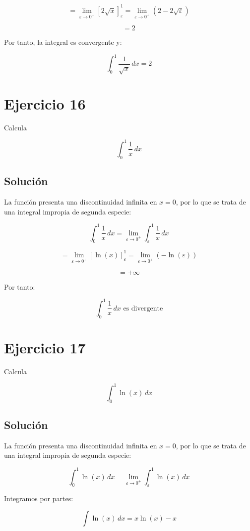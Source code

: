 \documentclass[fleqn]{article}
\begin{document}
	\[
	=
	\lim_{\varepsilon\to0^+}
	\left[
	2\sqrt{x}
	\right]_{\varepsilon}^1
	=
	\lim_{\varepsilon\to0^+}
	\left(
	2-2\sqrt{\varepsilon}
	\right)
	\]

	\[
	=
	2
	\]

	Por tanto, la integral es convergente y:

	\[
	\boxed{
	\int_0^1\frac{1}{\sqrt{x}}\,dx=2
	}
	\]

\section{Ejercicio 16}
	Calcula

	\[
	\int_0^1\frac{1}{x}\,dx
	\]

	\subsection{Solución}

	La función presenta una discontinuidad infinita en $x=0$, por lo que se trata de una integral impropia de segunda especie:

	\[
	\int_0^1\frac{1}{x}\,dx
	=
	\lim_{\varepsilon\to0^+}
	\int_{\varepsilon}^1\frac{1}{x}\,dx
	\]

	\[
	=
	\lim_{\varepsilon\to0^+}
	\left[
	\ln(x)
	\right]_{\varepsilon}^1
	=
	\lim_{\varepsilon\to0^+}
	\left(
	-\ln(\varepsilon)
	\right)
	\]

	\[
	=
	+\infty
	\]

	Por tanto:

	\[
	\boxed{
	\int_0^1\frac{1}{x}\,dx
	\text{ es divergente}
	}
	\]

\section{Ejercicio 17}
	Calcula

	\[
	\int_0^1\ln(x)\,dx
	\]

	\subsection{Solución}

	La función presenta una discontinuidad infinita en $x=0$, por lo que se trata de una integral impropia de segunda especie:

	\[
	\int_0^1\ln(x)\,dx
	=
	\lim_{\varepsilon\to0^+}
	\int_{\varepsilon}^1\ln(x)\,dx
	\]

	Integramos por partes:

	\[
	\int\ln(x)\,dx
	=
	x\ln(x)-x
	\]
\end{document}
